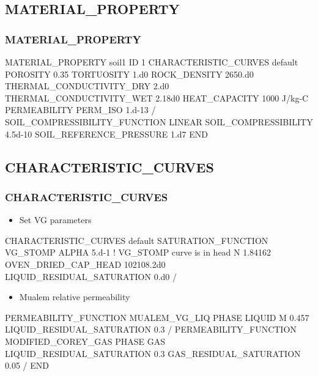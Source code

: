 \documentclass{beamer}
\newcommand\bluecomment[1]{{{\color{blue} #1}}}
\begin{document}
\subsection{MATERIAL\_PROPERTY}

\begin{frame}\frametitle{MATERIAL\_PROPERTY}

\begin{semiverbatim}
MATERIAL_PROPERTY soil1
  ID 1
  CHARACTERISTIC_CURVES default
  POROSITY 0.35
  TORTUOSITY 1.d0
  ROCK_DENSITY 2650.d0
  THERMAL_CONDUCTIVITY_DRY 2.d0
  THERMAL_CONDUCTIVITY_WET 2.18d0
  HEAT_CAPACITY 1000 J/kg-C
  PERMEABILITY
    PERM_ISO 1.d-13
  /
  SOIL_COMPRESSIBILITY_FUNCTION LINEAR
  SOIL_COMPRESSIBILITY 4.5d-10
  SOIL_REFERENCE_PRESSURE 1.d7
END
\end{semiverbatim}

\end{frame}

\subsection{CHARACTERISTIC\_CURVES}

\begin{frame}\frametitle{CHARACTERISTIC\_CURVES}

\begin{itemize}
\item Set VG parameters
\end{itemize}

\begin{semiverbatim}
CHARACTERISTIC_CURVES default
  SATURATION_FUNCTION VG_STOMP
    ALPHA 5.d-1 \bluecomment{! VG_STOMP curve is in head}
    N 1.84162
    OVEN_DRIED_CAP_HEAD 102108.2d0
    LIQUID_RESIDUAL_SATURATION 0.d0
  /
\end{semiverbatim}

\newpage
\begin{itemize}
\item Mualem relative permeability
\end{itemize}

\begin{semiverbatim}
  PERMEABILITY_FUNCTION MUALEM_VG_LIQ
    PHASE LIQUID
    M 0.457
    LIQUID_RESIDUAL_SATURATION 0.3
  /
  PERMEABILITY_FUNCTION MODIFIED_COREY_GAS
    PHASE GAS
    LIQUID_RESIDUAL_SATURATION 0.3
    GAS_RESIDUAL_SATURATION 0.05
  /
END
\end{semiverbatim}

\end{frame}
\end{document}
